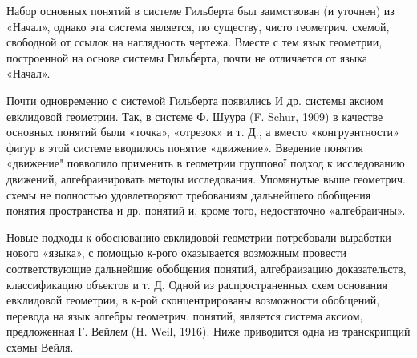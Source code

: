 \documentclass[10pt]{article}
\begin{document}
Набор основных понятий в системе Гильберта был заимствован (и уточнен) из «Начал», однако эта система является, по существу, чисто геометрич. схемой, свободной от ссылок на наглядность чертежа. Вместе с тем язык геометрии, построенной на основе системы Гильб́ерта, почти не отличается от языка «Начал».



Почти одновременно с системой Гильберта появились И др. системы аксиом евклидовой геометрии. Так, в системе Ф. Шуура (F. Schur, 1909) в качестве основных понятий были «точка», «отрезок» и т. Д., а вместо «конгруэнтности» фигур в этой системе вводилось понятие «движение». Введение понятия «движение" повволило применить в геометрии группової подход к исследованию движений, алгебраизировать методы исследования. Упомянутые выше геометрич. схемы не полностью удовлетворяют требованиям дальнейшего обобщения понятия пространства и др. понятий и, кроме того, недостаточно «алгебраичны».



Новые подходы к обоснованию евклидовой геометрии потребовали выработки нового «языка», с помощью к-рого оказывается возможным провести соответствующие дальнейшие обобщения понятий, алгебраизацию доказательств, классификацию объектов и т. Д. Одной из распространенных схем основания евклидовой геометрии, в к-рой сконцентрированы возможности обобщений, перевода на язык алгебры геометрич. понятий, является система аксиом, предложенная Г. Вейлем (H. Weil, 1916). Ниже приводится одна из транскрипций схөмы Вейля.
\end{document}
